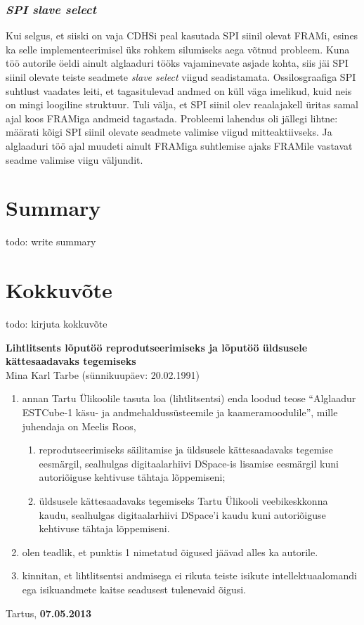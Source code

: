 \documentclass[12pt,a4paper]{article}
\begin{document}
\subsubsection{\textit{SPI slave select}}
Kui selgus, et siiski on vaja CDHSi peal kasutada SPI siinil olevat FRAMi,
esines ka selle implementeerimisel üks rohkem silumiseks aega võtnud probleem.
Kuna töö autorile öeldi ainult alglaaduri tööks vajaminevate asjade kohta, siis
jäi SPI siinil olevate teiste seadmete \textit{slave select} viigud
seadistamata. Ossilosgraafiga SPI suhtlust vaadates leiti, et tagasitulevad
andmed on küll väga imelikud, kuid neis on mingi loogiline struktuur. Tuli
välja, et SPI siinil olev reaalajakell üritas samal ajal koos FRAMiga andmeid
tagastada. Probleemi lahendus oli jällegi lihtne: määrati kõigi SPI siinil
olevate seadmete valimise viigud mitteaktiivseks. Ja alglaaduri töö ajal muudeti
ainult FRAMiga suhtlemise ajaks FRAMile vastavat seadme valimise viigu väljundit.

\section{Summary}
todo: write summary
\section{Kokkuvõte}
todo: kirjuta kokkuvõte

\label{viited}



\pagebreak
\textbf{Lihtlitsents lõputöö reprodutseerimiseks ja lõputöö üldsusele
kättesaadavaks tegemiseks}\\

Mina Karl Tarbe (sünnikuupäev: 20.02.1991)
\begin{enumerate}
	\item
		annan Tartu Ülikoolile tasuta loa (lihtlitsentsi) enda loodud teose ``Alglaadur
		ESTCube-1 käsu- ja andmehaldussüsteemile ja kaameramoodulile'', mille juhendaja on
		Meelis Roos,
		\begin{enumerate}
			\item 
				reprodutseerimiseks säilitamise ja üldsusele kättesaadavaks
				tegemise eesmärgil, sealhulgas digitaalarhiivi DSpace-is
				lisamise eesmärgil kuni autoriõiguse kehtivuse tähtaja
				lõppemiseni;
			\item
				üldsusele kättesaadavaks tegemiseks Tartu Ülikooli
				veebikeskkonna kaudu, sealhulgas digitaalarhiivi DSpace'i kaudu
				kuni autoriõiguse kehtivuse tähtaja lõppemiseni.
		\end{enumerate}
	\item
		olen teadlik, et punktis 1 nimetatud õigused jäävad alles ka autorile.
	\item
		kinnitan, et lihtlitsentsi andmisega ei rikuta teiste isikute
		intellektuaalomandi ega isikuandmete kaitse seadusest tulenevaid õigusi.
\end{enumerate}

Tartus, \textbf{07.05.2013}
\end{document}
